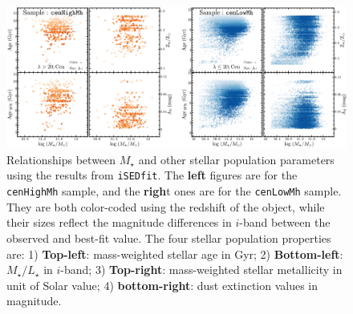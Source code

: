 \documentclass{emulateapj}
\def\rbcg{\texttt{cenHighMh}}
\def\nbcg{\texttt{cenLowMh}}
\def\mstar{{$M_{\star}$}}
\def\m2l{{$M_{\star}/L_{\star}$}}
\begin{document}
\begin{CJK*}{UTF8}{gbsn}
    \begin{figure}[hbt!]
        \begin{center}
        \includegraphics[width=\textwidth]{fig/redbcg_isedfit_2.pdf}
        \caption{
            Relationships between \mstar{} and other stellar population 
            parameters using the results from \texttt{iSEDfit}. 
            The \textbf{left} figures are for the \rbcg{} sample, and the 
            \textbf{righ}t ones are 
            for the \nbcg{} sample. 
            They are both color-coded using the redshift of the object, while 
            their sizes reflect the magnitude differences in $i$-band between 
            the observed and best-fit value. 
            The four stellar population properties are: 
            1) \textbf{Top-left}: mass-weighted stellar age in Gyr; 
            2) \textbf{Bottom-left}: \m2l{} in $i$-band; 
            3) \textbf{Top-right}: mass-weighted stellar metallicity in unit of Solar 
            value;
            4) \textbf{bottom-right}: dust extinction values in magnitude.
            }
        \label{fig:ised_2}
        \end{center}
    \end{figure}


\end{CJK*}
\end{document}
